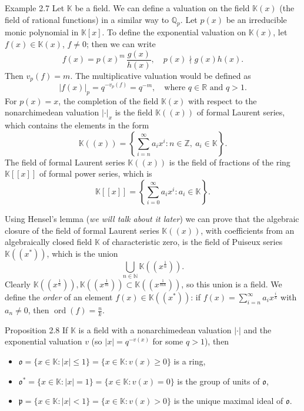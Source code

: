 \documentclass[11pt]{article}
\begin{document}
\begin{exbox}{Example 2.7}
Let $\mathbb{K}$ be a field. We can define a valuation on the field $\mathbb{K}(x)$ (the field of rational functions) in a similar way to $\mathbb{Q}_p$. Let $p(x)$ be an irreducible monic polynomial in $\mathbb{K}[x]$. To define the exponential valuation on $\mathbb{K}(x)$, let $f(x) \in \mathbb{K}(x)$, $f \neq 0$; then we can write
\[
f(x) = p(x)^m \, \frac{g(x)}{h(x)}, \quad p(x) \nmid g(x)h(x) .
\]
Then $v_p(f) = m$. The multiplicative valuation would be defined as
\[
|f(x)|_p = q^{-v_p(f)} = q^{-m}, \quad\text{where } q \in \mathbb{R} \text{ and } q > 1 .
\]
For $p(x) = x$, the completion of the field $\mathbb{K}(x)$ with respect to the nonarchimedean valuation $|\cdot|_x$ is the field $\mathbb{K}((x))$ of formal Laurent series, which contains the elements in the form
\[
\mathbb{K}((x)) = \left\{ \sum_{i=n}^\infty a_i x^i : n \in \mathbb{Z},\ a_i \in \mathbb{K} \right\}.
\]
The field of formal Laurent series $\mathbb{K}((x))$ is the field of fractions of the ring $\mathbb{K}[[x]]$ of formal power series, which is
\[
\mathbb{K}[[x]] = \left\{ \sum_{i=0}^\infty a_i x^i : a_i \in \mathbb{K} \right\}.
\]
\end{exbox}

Using Hensel's lemma (\textit{we will talk about it later}) we can prove that the algebraic closure of the field of formal Laurent series $\mathbb{K}((x))$, with coefficients from an algebraically closed field $\mathbb{K}$ of characteristic zero, is the field of Puiseux series $\mathbb{K}((x^*))$, which is the union
\[
\bigcup_{n \in \mathbb{N}} \mathbb{K}((x^{\frac1n})) .
\]
Clearly $\mathbb{K}((x^{\frac1n})), \mathbb{K}((x^{\frac1m})) \subset \mathbb{K}((x^{\frac{1}{mn}}))$, so this union is a field. We define the \textit{order} of an element $f(x) \in \mathbb{K}((x^*))$: if $f(x) = \sum_{i=n}^\infty a_i x^{\frac{i}{k}}$ with $a_n \neq 0$, then $\operatorname{ord}(f) = \frac{n}{k}$.

\begin{thmbox}{Proposition 2.8}
If $\mathbb{K}$ is a field with a nonarchimedean valuation $|\cdot|$ and the exponential valuation $v$ (so $|x| = q^{-v(x)}$ for some $q > 1$), then
\begin{itemize}
\item $\mathfrak{o} = \{x \in \mathbb{K} : |x| \leq 1\} = \{x \in \mathbb{K} : v(x) \geq 0\}$ is a ring,
\item $\mathfrak{o}^* = \{x \in \mathbb{K} : |x| = 1\} = \{x \in \mathbb{K} : v(x) = 0\}$ is the group of units of $\mathfrak{o}$,
\item $\mathfrak{p} = \{x \in \mathbb{K} : |x| < 1\} = \{x \in \mathbb{K} : v(x) > 0\}$ is the unique maximal ideal of $\mathfrak{o}$.
\end{itemize}
\end{thmbox}
\end{document}
